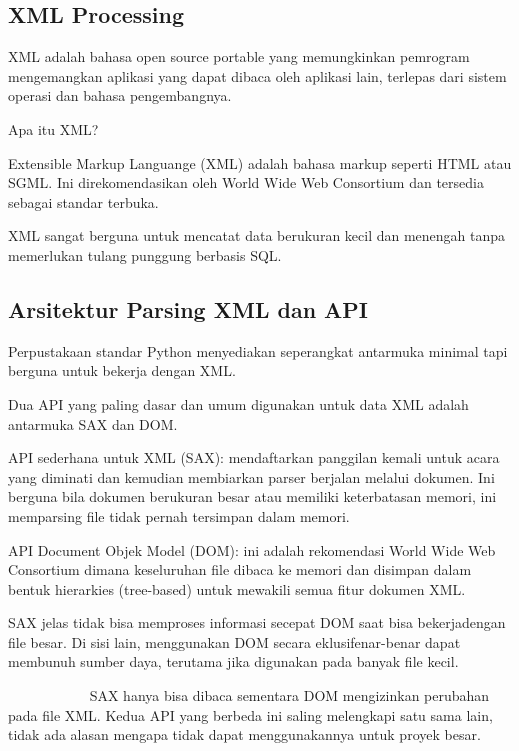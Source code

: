 \documentclass{wileySix}
\begin{document}
\begin{myEnumerate}
\chapter{XML Processing}
XML adalah bahasa open source portable yang memungkinkan pemrogram mengemangkan aplikasi yang dapat dibaca oleh aplikasi lain, terlepas dari sistem operasi dan bahasa pengembangnya. \par
\vspace{12pt}
\noindent 
Apa itu XML? \par
Extensible Markup Languange (XML) adalah bahasa markup seperti HTML atau SGML. Ini direkomendasikan oleh World Wide Web Consortium dan tersedia sebagai standar terbuka.  \par
XML sangat berguna untuk mencatat data berukuran kecil dan menengah tanpa memerlukan tulang punggung berbasis SQL. \par
\vspace{12pt}
\noindent 

\section{Arsitektur Parsing XML dan API}
 \par
\noindent 
\hspace*{0.5in} Perpustakaan standar Python menyediakan seperangkat antarmuka minimal tapi berguna untuk bekerja dengan XML.  \par
\noindent 
\hspace*{0.5in} Dua API yang paling dasar dan umum digunakan untuk data XML adalah antarmuka SAX dan DOM. \par
\noindent 
\hspace*{0.5in} API sederhana untuk XML (SAX): mendaftarkan panggilan kemali untuk acara yang diminati dan kemudian membiarkan parser berjalan melalui dokumen. Ini berguna bila dokumen berukuran besar atau memiliki keterbatasan memori, ini memparsing file tidak pernah tersimpan dalam memori. \par
\noindent 
\hspace*{0.5in} API Document Objek Model (DOM): ini adalah rekomendasi World Wide Web Consortium dimana keseluruhan file dibaca ke memori dan disimpan dalam bentuk hierarkies (tree-based) untuk mewakili semua fitur dokumen XML.  \par
\noindent 
\hspace*{0.5in} SAX jelas tidak bisa memproses informasi secepat DOM saat bisa bekerjadengan file besar. Di sisi lain, menggunakan DOM secara eklusifenar-benar dapat membunuh sumber daya, terutama jika digunakan pada banyak file kecil. \par
\noindent 
~~~~~~~~~~~ SAX hanya bisa dibaca sementara DOM mengizinkan perubahan pada file XML. Kedua API yang berbeda ini saling melengkapi satu sama lain, tidak ada alasan mengapa tidak dapat menggunakannya untuk proyek besar. \par
\noindent 



\end{myEnumerate}
\end{document}

